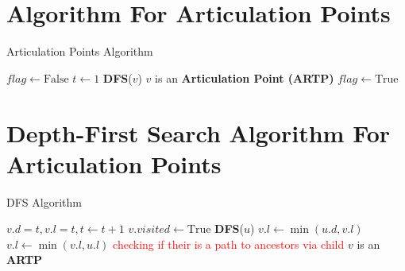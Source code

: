 \section{\textbf{Algorithm For Articulation Points}}

\begin{frame}{Articulation Points Algorithm}
    \begin{algorithm}[H]
        \caption{Finding Articulation Points}
        \begin{algorithmic}[1]
                \State $flag \gets \text{False}$
                \State $t \gets 1$
            \EndFor
                    \State \textbf{DFS}($v$)
                \EndIf
                \State $v$ is an \textbf{Articulation Point (ARTP)}
            \EndIf
            \State $flag \gets \text{True}$
            \EndFor
        \end{algorithmic}
    \end{algorithm}
\end{frame}

\section{\textbf{Depth-First Search Algorithm For Articulation Points}}

\begin{frame}{DFS Algorithm}
    \begin{algorithm}[H]
        \caption{DFS($v$)}
        \begin{algorithmic}[1]
            \State $v.d = t, v.l = t, t \gets t + 1$
            \State $v.visited \gets \text{True}$
                    \State \textbf{DFS}($u$)
                \EndIf
                    \State $v.l \gets \min(u.d, v.l)$
                \EndIf
                    \State $v.l \gets \min(v.l, u.l)$ \state \textcolor{red}{checking if their is a path to ancestors via child} 
                \EndIf
                    \State $v$ is an \textbf{ARTP}
                \EndIf
            \EndFor
        \end{algorithmic}
    \end{algorithm}
\end{frame}


